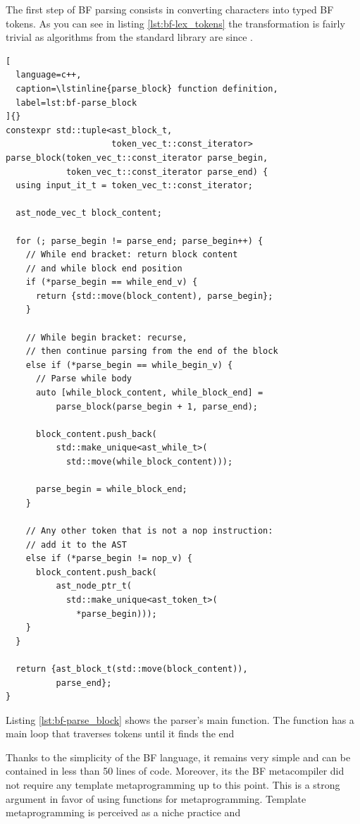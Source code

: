 \documentclass[../../main.tex]{subfiles}
\begin{document}
The first step of BF parsing consists in converting characters
into typed BF tokens. As you can see in listing \ref{lst:bf-lex_tokens}
the transformation is fairly trivial as algorithms from the \cpp standard
library are \constexpr since .

\begin{lstlisting}[
  language=c++,
  caption=\lstinline{parse_block} function definition,
  label=lst:bf-parse_block
]{}
constexpr std::tuple<ast_block_t,
                     token_vec_t::const_iterator>
parse_block(token_vec_t::const_iterator parse_begin,
            token_vec_t::const_iterator parse_end) {
  using input_it_t = token_vec_t::const_iterator;

  ast_node_vec_t block_content;

  for (; parse_begin != parse_end; parse_begin++) {
    // While end bracket: return block content
    // and while block end position
    if (*parse_begin == while_end_v) {
      return {std::move(block_content), parse_begin};
    }

    // While begin bracket: recurse,
    // then continue parsing from the end of the block
    else if (*parse_begin == while_begin_v) {
      // Parse while body
      auto [while_block_content, while_block_end] =
          parse_block(parse_begin + 1, parse_end);

      block_content.push_back(
          std::make_unique<ast_while_t>(
            std::move(while_block_content)));

      parse_begin = while_block_end;
    }

    // Any other token that is not a nop instruction:
    // add it to the AST
    else if (*parse_begin != nop_v) {
      block_content.push_back(
          ast_node_ptr_t(
            std::make_unique<ast_token_t>(
              *parse_begin)));
    }
  }

  return {ast_block_t(std::move(block_content)),
          parse_end};
}
\end{lstlisting}

Listing \ref{lst:bf-parse_block} shows the parser's main function.
The function has a main loop that traverses tokens until it finds the end


Thanks to the simplicity of the BF language, it remains very simple
and can be contained in less than 50 lines of code.
Moreover, its the BF metacompiler did not require any template metaprogramming
up to this point. This is a strong argument in favor of using \constexpr
functions for metaprogramming. Template metaprogramming is perceived as a niche
practice and
\end{document}
